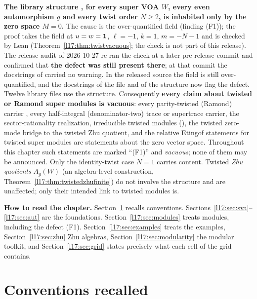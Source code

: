 \begin{warning}[title={Read first: \texttt{SuperTwistedModule} can only be the zero module for $N\ge2$}]\label{l17:warn:twistzero}
\textbf{The library structure , for every super VOA $W$, every even automorphism $g$ and every
twist order $N\ge2$, is inhabited only by the zero space $M=0$.} The cause is the over-quantified  field
(finding (F1)); the proof takes the  field at $u=w=\mathbf{1}$, $\ell=-1$, $k=1$, $m=-N-1$ and is checked
by Lean (Theorem~\ref{l17:thm:twistvacuous}; the check is not part of this release). The release audit of 2026-10-27 re-ran the check at a later pre-release commit and confirmed that \textbf{the
defect was still present there}; at that commit the docstrings of  carried no warning. In the released source the  field is still over-quantified, and the
docstrings of the file and of the structure now flag the defect. Twelve library files use
the structure. Consequently \textbf{every claim about twisted or Ramond super modules is vacuous}: every parity-twisted
(Ramond) carrier , every half-integral (denominator-two) trace or supertrace carrier, the
sector-rationality realization, irreducible twisted modules (), the twisted zero-mode
bridge to the twisted Zhu quotient, and the relative Etingof statements for twisted super modules are statements about the zero
vector space. Throughout this chapter such statements are marked ``(F1)'' and \emph{vacuous}; none of them may be announced.
Only the identity-twist case $N=1$ carries content. Twisted \emph{Zhu quotients} $A_g(W)$ (an algebra-level construction,
Theorem~\ref{l17:thm:twistedzhufinite}) do not involve the structure and are unaffected; only their intended link to twisted
modules is.
\end{warning}

\textbf{How to read the chapter.} Section~\ref{l17:sec:conv} recalls conventions.
Sections~\ref{l17:sec:sva}--\ref{l17:sec:aut} are the foundations. Section~\ref{l17:sec:modules}
treats modules, including the defect (F1). Section~\ref{l17:sec:examples} treats the examples,
Section~\ref{l17:sec:zhu} Zhu algebras, Section~\ref{l17:sec:modularity} the modular toolkit, and
Section~\ref{l17:sec:grid} states precisely what each cell of the grid contains.

\section{Conventions recalled}\label{l17:sec:conv}

